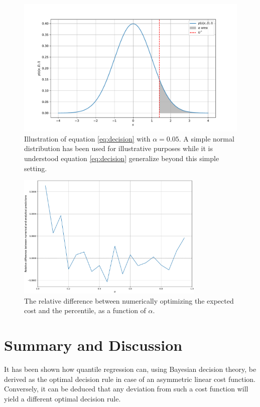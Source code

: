 \documentclass[a4paper,11pt, oneside]{article}
\theoremstyle{definition}
\begin{document}
	\begin{figure}[H]
		\centering
		\includegraphics[width = 1\textwidth]{figures/alpha_plot.pdf}
		\caption{Illustration of equation \eqref{eq:decision} with $\alpha = 0.05$. A simple normal distribution has been used for illustrative purposes while it is understood equation \eqref{eq:decision} generalize beyond this simple setting.}
		\label{fig:2}
	\end{figure}
	\begin{figure}[H]
		\centering
		\includegraphics[width = 0.8\textwidth]{figures/numerical_example.pdf}
		\caption{The relative difference between numerically optimizing the expected cost and the percentile, as a function of $\alpha$.}
		\label{fig:3}
	\end{figure}
	
	\section{Summary and Discussion}	
	It has been shown how quantile regression can, using Bayesian decision theory, be derived as the optimal decision rule in case of an asymmetric linear cost function. Conversely, it can be deduced that any deviation from such a cost function will yield a different optimal decision rule.
	
	
	
	
	
\end{document}
